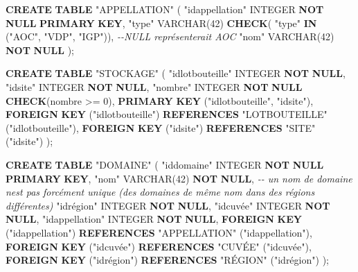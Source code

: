 \documentclass[11pt]{article}
\newenvironment{Shaded}{}{}
\newcommand{\KeywordTok}[1]{\textcolor[rgb]{0.00,0.44,0.13}{\textbf{{#1}}}}
\newcommand{\DataTypeTok}[1]{\textcolor[rgb]{0.56,0.13,0.00}{{#1}}}
\newcommand{\DecValTok}[1]{\textcolor[rgb]{0.25,0.63,0.44}{{#1}}}
\newcommand{\CommentTok}[1]{\textcolor[rgb]{0.38,0.63,0.69}{\textit{{#1}}}}
\newcommand{\OtherTok}[1]{\textcolor[rgb]{0.00,0.44,0.13}{{#1}}}
\newcommand{\NormalTok}[1]{{#1}}
\newcommand{\OperatorTok}[1]{\textcolor[rgb]{0.40,0.40,0.40}{{#1}}}
\begin{document}
\begin{Shaded}
\begin{Highlighting}[]
\KeywordTok{CREATE} \KeywordTok{TABLE} \OtherTok{"APPELLATION"}\NormalTok{ (}
  \OtherTok{"idappellation"} \DataTypeTok{INTEGER} \KeywordTok{NOT} \KeywordTok{NULL} \KeywordTok{PRIMARY} \KeywordTok{KEY}\NormalTok{,}
  \OtherTok{"type"} \DataTypeTok{VARCHAR}\NormalTok{(}\DecValTok{42}\NormalTok{) }\KeywordTok{CHECK}\NormalTok{( }\OtherTok{"type"} \KeywordTok{IN}\NormalTok{ (}\OtherTok{"AOC"}\NormalTok{, }\OtherTok{"VDP"}\NormalTok{, }\OtherTok{"IGP"}\NormalTok{)), }\CommentTok{{-}{-}NULL représenterait AOC}
  \OtherTok{"nom"} \DataTypeTok{VARCHAR}\NormalTok{(}\DecValTok{42}\NormalTok{) }\KeywordTok{NOT} \KeywordTok{NULL}
\NormalTok{);}




\KeywordTok{CREATE} \KeywordTok{TABLE} \OtherTok{"STOCKAGE"}\NormalTok{ (}
  \OtherTok{"idlotbouteille"} \DataTypeTok{INTEGER} \KeywordTok{NOT} \KeywordTok{NULL}\NormalTok{,}
  \OtherTok{"idsite"} \DataTypeTok{INTEGER} \KeywordTok{NOT} \KeywordTok{NULL}\NormalTok{,}
  \OtherTok{"nombre"} \DataTypeTok{INTEGER} \KeywordTok{NOT} \KeywordTok{NULL} \KeywordTok{CHECK}\NormalTok{(nombre }\OperatorTok{>=} \DecValTok{0}\NormalTok{),}
  \KeywordTok{PRIMARY} \KeywordTok{KEY}\NormalTok{ (}\OtherTok{"idlotbouteille"}\NormalTok{, }\OtherTok{"idsite"}\NormalTok{),}
  \KeywordTok{FOREIGN} \KeywordTok{KEY}\NormalTok{ (}\OtherTok{"idlotbouteille"}\NormalTok{) }\KeywordTok{REFERENCES} \OtherTok{"LOTBOUTEILLE"}\NormalTok{ (}\OtherTok{"idlotbouteille"}\NormalTok{),}
  \KeywordTok{FOREIGN} \KeywordTok{KEY}\NormalTok{ (}\OtherTok{"idsite"}\NormalTok{) }\KeywordTok{REFERENCES} \OtherTok{"SITE"}\NormalTok{ (}\OtherTok{"idsite"}\NormalTok{)}
\NormalTok{);}




\KeywordTok{CREATE} \KeywordTok{TABLE} \OtherTok{"DOMAINE"}\NormalTok{ (}
   \OtherTok{"iddomaine"} \DataTypeTok{INTEGER} \KeywordTok{NOT} \KeywordTok{NULL} \KeywordTok{PRIMARY} \KeywordTok{KEY}\NormalTok{,}
    \OtherTok{"nom"} \DataTypeTok{VARCHAR}\NormalTok{(}\DecValTok{42}\NormalTok{)  }\KeywordTok{NOT} \KeywordTok{NULL}\NormalTok{,       }\CommentTok{{-}{-} un nom de domaine n\textquotesingle{}est pas forcément unique (des domaines de même nom dans des régions différentes)  }
  \OtherTok{"idrégion"} \DataTypeTok{INTEGER} \KeywordTok{NOT} \KeywordTok{NULL}\NormalTok{,}
  \OtherTok{"idcuvée"} \DataTypeTok{INTEGER} \KeywordTok{NOT} \KeywordTok{NULL}\NormalTok{,}
  \OtherTok{"idappellation"} \DataTypeTok{INTEGER} \KeywordTok{NOT} \KeywordTok{NULL}\NormalTok{,}
  \KeywordTok{FOREIGN} \KeywordTok{KEY}\NormalTok{ (}\OtherTok{"idappellation"}\NormalTok{) }\KeywordTok{REFERENCES} \OtherTok{"APPELLATION"}\NormalTok{ (}\OtherTok{"idappellation"}\NormalTok{),}
  \KeywordTok{FOREIGN} \KeywordTok{KEY}\NormalTok{ (}\OtherTok{"idcuvée"}\NormalTok{) }\KeywordTok{REFERENCES} \OtherTok{"CUVÉE"}\NormalTok{ (}\OtherTok{"idcuvée"}\NormalTok{),}
  \KeywordTok{FOREIGN} \KeywordTok{KEY}\NormalTok{ (}\OtherTok{"idrégion"}\NormalTok{) }\KeywordTok{REFERENCES} \OtherTok{"RÉGION"}\NormalTok{ (}\OtherTok{"idrégion"}\NormalTok{)}
\NormalTok{);}



\end{Highlighting}
\end{Shaded}
\end{document}
